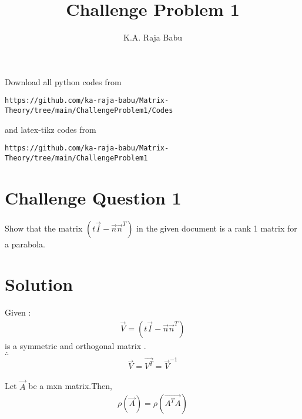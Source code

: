 \documentclass[journal,12pt,twocolumn]{IEEEtran}
\begin{document}
     \def\rightbox#1{\makebox[0in][r]{#1}}
     \def\centbox#1{\makebox[0in]{#1}}
     \def\topbox#1{\raisebox{-\baselineskip}[0in][0in]{#1}}
     \def\midbox#1{\raisebox{-0.5\baselineskip}[0in][0in]{#1}}
\vspace{3cm}
\title{Challenge Problem 1}
\author{K.A. Raja Babu}
\maketitle
\newpage
\bigskip
\renewcommand{\thefigure}{\theenumi}
\renewcommand{\thetable}{\theenumi}
Download all python codes from 
\begin{lstlisting}
https://github.com/ka-raja-babu/Matrix-Theory/tree/main/ChallengeProblem1/Codes
\end{lstlisting}
%
and latex-tikz codes from 
%
\begin{lstlisting}
https://github.com/ka-raja-babu/Matrix-Theory/tree/main/ChallengeProblem1
\end{lstlisting}
%
\section{Challenge Question 1}
Show that the matrix $(t\vec{I}-\vec{n}\vec{n}^T)$ in the given document is a rank 1 matrix for a parabola.
%
\section{Solution}
Given :
\begin{align}
    \vec{V} = (t\vec{I}-\vec{n}\vec{n}^T) 
\end{align}
is a symmetric and orthogonal matrix .
\\
$\therefore$
\begin{align}
    \vec{V} = \vec{V^T} = \vec{V}^{-1} \label{eq2}
\end{align}


\begin{lemma}
Let $\vec{A}$ be a mxn matrix.Then,
\begin{align}
   \rho(\vec{A}) = \rho(\vec{A^TA}) \label{eq1}
\end{align}
\end{lemma}
\end{document}
